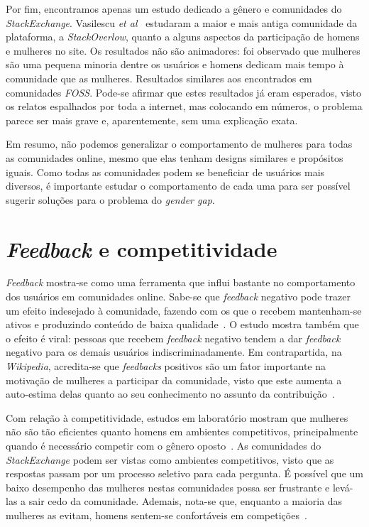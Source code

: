 Por fim, encontramos apenas um estudo dedicado a gênero e comunidades do \emph{StackExchange}. Vasilescu \emph{et al}~\cite{Vasilescu27092013} estudaram a maior e mais antiga comunidade da plataforma, a \emph{StackOverlow}, quanto a alguns aspectos da participação de homens e mulheres no site. Os resultados não são animadores: foi observado que mulheres são uma pequena minoria dentre os usuários e homens dedicam mais tempo à comunidade que as mulheres. Resultados similares aos encontrados em comunidades \emph{FOSS}\cite{rustad2011suck,powell2010gender}. Pode-se afirmar que estes resultados já eram esperados, visto os relatos espalhados por toda a internet, mas colocando em números, o problema parece ser mais grave e, aparentemente, sem uma explicação exata.

\bigskip

Em resumo, não podemos generalizar o comportamento de mulheres para todas as comunidades online, mesmo que elas tenham designs similares e propósitos iguais. Como todas as comunidades podem se beneficiar de usuários mais diversos, é importante estudar o comportamento de cada uma para ser possível sugerir soluções para o problema do \textit{gender gap}.

\section{\emph{Feedback} e competitividade}

\emph{Feedback} mostra-se como uma ferramenta que influi bastante no comportamento dos usuários em comunidades online. Sabe-se que \emph{feedback} negativo pode trazer um efeito indesejado à comunidade, fazendo com os que o recebem mantenham-se ativos e produzindo conteúdo de baixa qualidade~\cite{cheng2014community}. O estudo mostra também que o efeito é viral: pessoas que recebem \emph{feedback} negativo tendem a dar \emph{feedback} negativo para os demais usuários indiscriminadamente. Em contrapartida, na \emph{Wikipedia}, acredita-se que \emph{feedbacks} positivos são um fator importante na motivação de mulheres a participar da comunidade, visto que este aumenta a auto-estima delas quanto ao seu conhecimento no assunto da contribuição~\cite{collier2012conflict}.

Com relação à competitividade, estudos em laboratório mostram que mulheres não são tão eficientes quanto homens em ambientes competitivos, principalmente quando é necessário competir com o gênero oposto~\cite{gneezy2003performance}. As comunidades do \emph{StackExchange} podem ser vistas como ambientes competitivos, visto que as respostas passam por um processo seletivo para cada pergunta. É possível que um baixo desempenho das mulheres nestas comunidades possa ser frustrante e levá-las a sair cedo da comunidade. Ademais, nota-se que, enquanto a maioria das mulheres as evitam, homens sentem-se confortáveis em competições~\cite{niederle2005women,croson2009gender}.

